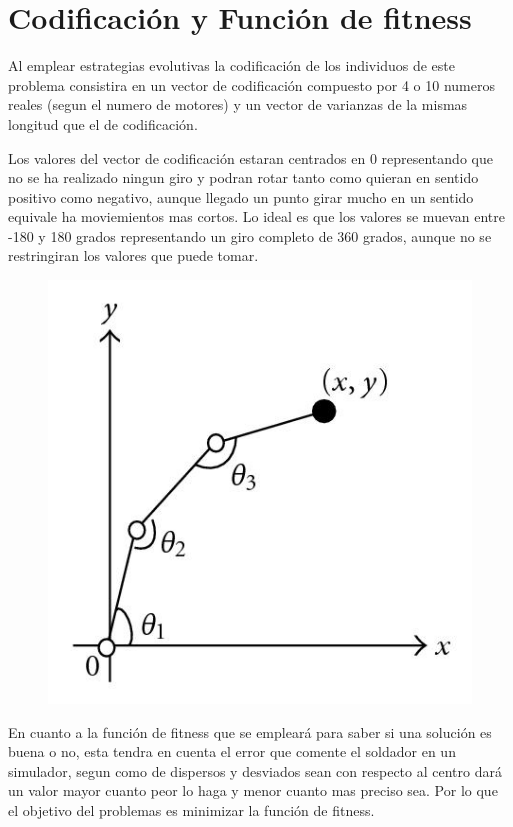 \documentclass[12pt, spanish, pdftex]{UC3M_document}
\begin{document}
\section{Codificación y Función de fitness}
Al emplear estrategias evolutivas la codificación de los individuos de este problema consistira en un vector de codificación compuesto por 4 o 10 numeros reales (segun el numero de motores) y un vector de varianzas de la mismas longitud que el de codificación.

Los valores del vector de codificación estaran centrados en 0 representando que no se ha realizado ningun giro y podran rotar tanto como quieran en sentido positivo como negativo, aunque llegado un punto girar mucho en un sentido equivale ha moviemientos mas cortos. Lo ideal es que los valores se muevan entre -180 y 180 grados representando un giro completo de 360 grados, aunque no se restringiran los valores que puede tomar.
\begin{figure}[H]
	{\includegraphics[scale=1.5]{./img/arm_angles.jpg}}
\end{figure}

En cuanto a la función de fitness que se empleará para saber si una solución es buena o no, esta tendra en cuenta el error que comente el soldador en un simulador, segun como de dispersos y desviados sean con respecto al centro dará un valor mayor cuanto peor lo haga y menor cuanto mas preciso sea. Por lo que el objetivo del problemas es minimizar la función de fitness.
\end{document}
